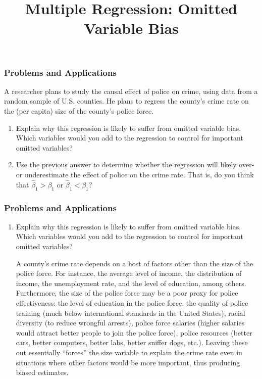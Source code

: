 \title[Multiple Regression]{Multiple Regression: Omitted Variable Bias}
\date{}







\begin{frame}
\frametitle{Problems and Applications}
A researcher plans to study the causal effect of police on crime, using data from a random sample of U.S. counties. He plans to regress the county's crime rate on the (per capita) size of the county's police force.
\begin{enumerate}
\item Explain why this regression is likely to suffer from omitted variable bias. Which variables would you add to the regression to control for important omitted variables?
\item Use the previous answer to determine whether the regression will likely over- or underestimate the effect of police on the crime rate. That is, do you think that $\hat{\beta}_{1}>\beta_{1}$ or $\hat{\beta}_{1}<\beta_{1}$?
\end{enumerate}
\end{frame}


\begin{frame}
\frametitle{Problems and Applications}

\begin{enumerate}\setcounter{enumi}{0}

\item Explain why this regression is likely to suffer from omitted variable bias. Which variables would you add to the regression to control for important omitted variables?

\begin{answer}
A county's crime rate depends on a host of factors other than the size of the police force. For instance, the average level of income, the distribution of income, the unemployment rate, and the level of education, among others. Furthermore, the size of the police force may be a poor proxy for police effectiveness: the level of education in the police force, the quality of police training (much below international standards in the United States), racial diversity (to reduce wrongful arrests), police force salaries (higher salaries would attract better people to join the police force), police resources (better cars, better computers, better labs, better sniffer dogs, etc.).  Leaving these out essentially ``forces'' the size variable to explain the crime rate even in situations where other factors would be more important, thus producing biased estimates.
\end{answer}

\end{enumerate}
\end{frame}


